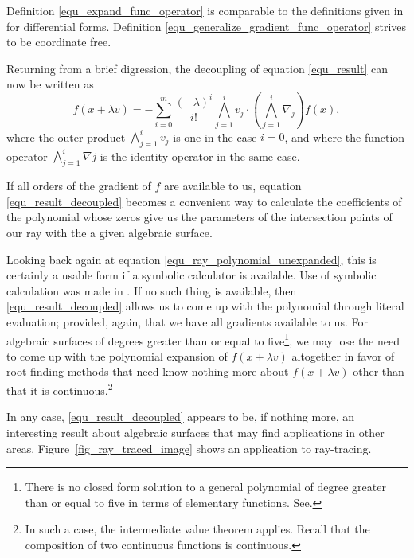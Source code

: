\documentclass{birkjour}
\theoremstyle{definition}
\theoremstyle{remark}
\numberwithin{equation}{section}
\begin{document}
Definition \eqref{equ_expand_func_operator} is comparable to the
definitions given in \cite{Hestenes93,Macdonald12} for differential forms.
Definition \eqref{equ_generalize_gradient_func_operator} strives to be coordinate free.

Returning from a brief digression, the decoupling of equation \eqref{equ_result} can now be written as
\begin{equation}\label{equ_result_decoupled}
f(x+\lambda v) = -\sum_{i=0}^m\frac{(-\lambda)^i}{i!}\bigwedge_{j=1}^i v_j\cdot\left(\bigwedge_{j=1}^i\nabla_j\right)f(x),
\end{equation}
where the outer product $\bigwedge_{j=1}^i v_j$ is one in the case $i=0$, and where the function
operator $\bigwedge_{j=1}^i\nabla j$ is the identity operator in the same case.

If all orders of the gradient of $f$ are available to us, equation \eqref{equ_result_decoupled} becomes
a convenient way to calculate the coefficients of the polynomial whose zeros give us the parameters of
the intersection points of our ray with the a given algebraic surface.

Looking back again at equation \eqref{equ_ray_polynomial_unexpanded}, this is certainly a usable form
if a symbolic calculator is available.  Use of symbolic calculation was made in \cite{Hanrahan83}.  If no such
thing is available, then \eqref{equ_result_decoupled} allows us to come up with the polynomial
through literal evaluation; provided, again, that we have all gradients available to us.
For algebraic surfaces of degrees greater than or equal to five\footnote{There is no closed form solution
to a general polynomial of degree greater than or equal to five in terms of elementary functions.  See\cite{}.}, we may
lose the need to come up
with the polynomial expansion of $f(x+\lambda v)$ altogether in favor of root-finding methods
that need know nothing more about $f(x+\lambda v)$ other than that it is continuous.\footnote{In such a
case, the intermediate value theorem applies.  Recall that the composition of two continuous functions
is continuous.}

In any case, \eqref{equ_result_decoupled} appears to be, if nothing more, an
interesting result about algebraic surfaces that may find applications in other areas.
Figure~\ref{fig_ray_traced_image} shows an application to ray-tracing.




\end{document}
